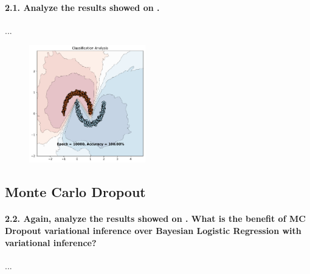 \paragraph{2.1. Analyze the results showed on .}

...

\begin{figure}[H]
    \centering
    \includegraphics[width=0.45\textwidth]{mlp_variational.pdf}
    \caption{}
    \label{fig:mlp_variational}
\end{figure}


\subsection{Monte Carlo Dropout}
\paragraph{2.2. Again, analyze the results showed on . What is the benefit of MC Dropout variational inference over Bayesian Logistic Regression with variational inference?}

...

